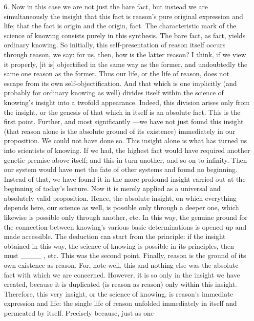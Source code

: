 6. Now in this case we are not just the bare fact,
but instead we are simultaneously
the insight that this fact is
reason’s pure original expression and life;
that the fact is origin and the origin, fact.
The characteristic mark of the science of knowing
consists purely in this synthesis.
The bare fact, as fact, yields ordinary knowing.
So initially, this self-presentation of reason
itself occurs through reason, we say:
for us, then, how is the latter reason?
I think, if we view it properly,
[it is] objectified in the same way as the former,
and undoubtedly the same one reason as the former.
Thus our life, or the life of reason,
does not escape from its own self-objectification.
And that which is one implicitly
(and probably for ordinary knowing as well)
divides itself within the science of knowing’s
insight into a twofold appearance.
Indeed, this division arises only from the insight,
or the genesis of that which in itself is an absolute fact.
This is the first point.
Further, and most significantly
—we have not just found this insight
(that reason alone is the absolute ground of its existence)
immediately in our proposition.
We could not have done so.
This insight alone is what has
turned us into scientists of knowing.
If we had, the highest fact would have required
another genetic premise above itself;
and this in turn another, and so on to infinity.
Then our system would have met the fate
of other systems and found no beginning.
Instead of that, we have found it
in the more profound insight
carried out at the beginning of today’s lecture.
Now it is merely applied as
a universal and absolutely valid proposition.
Hence, the absolute insight,
on which everything depends here,
our science as well, is possible only through a deeper one,
which likewise is possible only through another, etc.
In this way, the genuine ground for the connection
between knowing’s various basic determinations is
opened up and made accessible.
The deduction can start from the principle:
if the insight obtained in this way,
the science of knowing is possible in its principles,
then must ____ , etc.
This was the second point.
Finally, reason is the ground of its own existence as reason.
For, note well, this and nothing else was
the absolute fact with which we are concerned.
However, it is so only in the insight we have created,
because it is duplicated (is reason as reason)
only within this insight.
Therefore, this very insight,
or the science of knowing, is
reason’s immediate expression and life:
the single life of reason unfolded
immediately in itself and permeated by itself.
Precisely because, just as one
